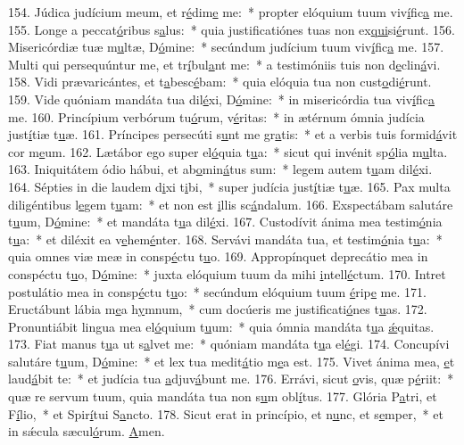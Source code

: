 154. Júdica judícium meum, et r\uline{é}dim\uline{e} me:~* propter elóquium tuum viv\uline{í}fic\uline{a} me.
155. Longe a peccat\uline{ó}ribus s\uline{a}lus:~* quia justificatiónes tuas non ex\uline{qui}si\uline{é}runt.
156. Misericórdiæ tuæ m\uline{u}ltæ, D\uline{ó}mine:~* secúndum judícium tuum viv\uline{í}fic\uline{a} me.
157. Multi qui persequúntur me, et tr\uline{í}bul\uline{a}nt me:~* a testimóniis tuis non d\uline{e}clin\uline{á}vi.
158. Vidi prævaricántes, et t\uline{a}besc\uline{é}bam:~* quia elóquia tua non cust\uline{o}di\uline{é}runt.
159. Vide quóniam mandáta tua dil\uline{é}xi, D\uline{ó}mine:~* in misericórdia tua viv\uline{í}fic\uline{a} me.
160. Princípium verbórum tu\uline{ó}rum, v\uline{é}ritas:~* in ætérnum ómnia judícia just\uline{í}tiæ t\uline{u}æ.
161. Príncipes persecúti s\uline{u}nt me gr\uline{a}tis:~* et a verbis tuis formid\uline{á}vit cor m\uline{e}um.
162. Lætábor ego super el\uline{ó}quia t\uline{u}a:~* sicut qui invénit sp\uline{ó}lia m\uline{u}lta.
163. Iniquitátem ódio hábui, et ab\uline{o}min\uline{á}tus sum:~* legem autem t\uline{u}am dil\uline{é}xi.
164. Sépties in die laudem d\uline{i}xi t\uline{i}bi,~* super judícia just\uline{í}tiæ t\uline{u}æ.
165. Pax multa diligéntibus l\uline{e}gem t\uline{u}am:~* et non est \uline{i}llis sc\uline{á}ndalum.
166. Exspectábam salutáre t\uline{u}um, D\uline{ó}mine:~* et mandáta t\uline{u}a dil\uline{é}xi.
167. Custodívit ánima mea testim\uline{ó}nia t\uline{u}a:~* et diléxit ea v\uline{e}hem\uline{é}nter.
168. Servávi mandáta tua, et testim\uline{ó}nia t\uline{u}a:~* quia omnes viæ meæ in consp\uline{é}ctu t\uline{u}o.
169. Appropínquet deprecátio mea in conspéctu t\uline{u}o, D\uline{ó}mine:~* juxta elóquium tuum da mihi \uline{i}ntell\uline{é}ctum.
170. Intret postulátio mea in consp\uline{é}ctu t\uline{u}o:~* secúndum elóquium tuum \uline{é}rip\uline{e} me.
171. Eructábunt lábia m\uline{e}a h\uline{y}mnum,~* cum docúeris me justificati\uline{ó}nes t\uline{u}as.
172. Pronuntiábit lingua mea el\uline{ó}quium t\uline{u}um:~* quia ómnia mandáta t\uline{u}a \uline{ǽ}quitas.
173. Fiat manus t\uline{u}a ut s\uline{a}lvet me:~* quóniam mandáta t\uline{u}a el\uline{é}gi.
174. Concupívi salutáre t\uline{u}um, D\uline{ó}mine:~* et lex tua medit\uline{á}tio m\uline{e}a est.
175. Vivet ánima mea, \uline{e}t laud\uline{á}bit te:~* et judícia tua \uline{a}djuv\uline{á}bunt me.
176. Errávi, sicut \uline{o}vis, quæ p\uline{é}riit:~* quæ re servum tuum, quia mandáta tua non s\uline{u}m obl\uline{í}tus.
177. Glória P\uline{a}tri, et F\uline{í}lio,~* et Spir\uline{í}tui S\uline{a}ncto.
178. Sicut erat in princípio, et n\uline{u}nc, et s\uline{e}mper,~* et in sǽcula sæcul\uline{ó}rum. \uline{A}men.
